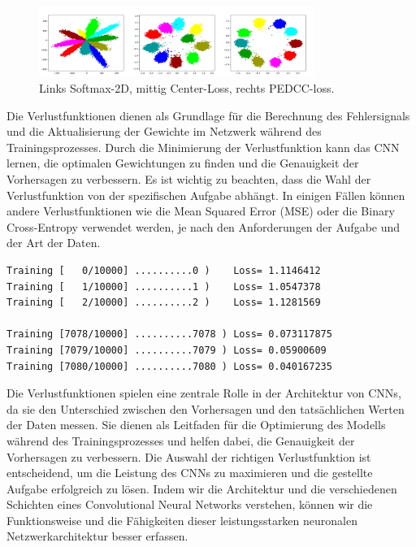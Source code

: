         \begin{figure}[h]
            \centering
            \includegraphics[width=0.8\textwidth]{img/loss_functions.png}
            \caption{Links Softmax-2D, mittig Center-Loss, rechts PEDCC-loss.}
            \label{fig:loss_functions}
        \end{figure}
    
    Die Verlustfunktionen dienen als Grundlage für die Berechnung des Fehlersignals und die Aktualisierung der Gewichte im Netzwerk während des Trainingsprozesses. Durch die Minimierung der Verlustfunktion kann das \ac{CNN} lernen, die optimalen Gewichtungen zu finden und die Genauigkeit der Vorhersagen zu verbessern.
    Es ist wichtig zu beachten, dass die Wahl der Verlustfunktion von der spezifischen Aufgabe abhängt. 
    In einigen Fällen können andere Verlustfunktionen wie die Mean Squared Error (MSE) oder die Binary Cross-Entropy verwendet werden, je nach den Anforderungen der Aufgabe und der Art der Daten.

\begin{lstlisting}[caption={Trainingsverlustverlauf: Unsere Loss-Funktion nimmt kontinuierlich ab, was auf eine verbesserte Modellleistung hinweist.}]
Training [   0/10000] ..........0 )    Loss= 1.1146412
Training [   1/10000] ..........1 )    Loss= 1.0547378
Training [   2/10000] ..........2 )    Loss= 1.1281569

Training [7078/10000] ..........7078 ) Loss= 0.073117875
Training [7079/10000] ..........7079 ) Loss= 0.05900609
Training [7080/10000] ..........7080 ) Loss= 0.040167235
\end{lstlisting}

    Die Verlustfunktionen spielen eine zentrale Rolle in der Architektur von \acp{CNN}, da sie den Unterschied zwischen den Vorhersagen und den tatsächlichen Werten der Daten messen. 
    Sie dienen als Leitfaden für die Optimierung des Modells während des Trainingsprozesses und helfen dabei, die Genauigkeit der Vorhersagen zu verbessern. 
    Die Auswahl der richtigen Verlustfunktion ist entscheidend, um die Leistung des \acp{CNN} zu maximieren und die gestellte Aufgabe erfolgreich zu lösen.
    Indem wir die Architektur und die verschiedenen Schichten eines Convolutional Neural Networks verstehen, können wir die Funktionsweise und die Fähigkeiten dieser leistungsstarken neuronalen Netzwerkarchitektur besser erfassen. 
    

